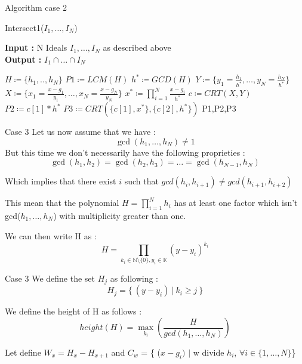 \documentclass{beamer}
\begin{document}
\begin{frame}{Algorithm case 2}
    \begin{algorithm}[H]
    \caption{Intersect1($I_{1},\dots,I_{N}$)}\label{alg:intersect-n-ideals-equal-gcd}
    \textbf{Input : } N Ideals $I_{1},\dots,I_{N}$ as described above \\
    \textbf{Output : }$I_{1} \cap \dots\cap I_ {N}$
\begin{algorithmic}
    \State $H \coloneqq \{h_{1},..,h_{N}\}$
    \State $P1 \coloneqq LCM(H)$
    \State $h^{*} \coloneqq GCD(H)$
    \State $Y\coloneqq \{y_{1}= \frac{h_{1}}{h^{*}},\dots,y_{N}= \frac{h_{N}}{h^{*}}\}$
    \State $X \coloneqq \{x_{1} = \frac{x-g_{1}}{y_{1}},\dots,x_{N} =\frac{x-g_{N}}{y_{N}}\}$
    \State $x^{*} \coloneqq \prod^{N}_{i=1} \frac{x-g_{i}}{h^{*}}$
    \State $c\coloneqq CRT(X,Y)$
    \State $P2 \coloneqq c[1]*h^{*}$ 
    \State $P3 \coloneqq CRT(\{c[1],x^{*}\},\{c[2], h^{*}\})$
    \State \Return P1,P2,P3
\end{algorithmic}
\end{algorithm}
\end{frame}

\begin{frame}{Case 3}
Let us now assume that we have :
\[\gcd(h_{1},\dots,h_{N}) \neq 1\]
But this time we don't necessarily have the following proprieties :
\[\gcd(h_{1},h_{2}) = \gcd(h_{2},h_{3}) = \dots = \gcd(h_{N-1},h_{N}) \]

Which implies that there exist $i$ such that $gcd(h_{i},h_{i+1}) \neq gcd(h_{i+1},h_{i+2})$

This mean that the polynomial $H = \prod_{i=1}^{N} h_{i}$ has at least one factor which isn't gcd($h_{1},\dots,h_{N}$) with multiplicity greater than one.

We can then write H as :
\[H=\prod_{k_{i} \in \mathbb{N}
 \setminus \{0\}, y_{i}\in \mathbb{K}} (y-y_{i})^{k_{i}}\]

\end{frame}

\begin{frame}{Case 3}
    We define the set $H_{j}$ as following :
\[H_{j} = \{\ (y-y_{i}) \ |\  k_{i} \geq j\ \}\]

We define the height of H as follows : \[height(H) = \max_{k_{i}}(\frac{H}{gcd(h_{1},\dots,h_{N})})\]

Let define $W_{x} = H_{x}-H_{x+1}$ and $C_{w}$ = \{ ($x-g_{i})$ $|$ w divide $h_{i}$, $\forall i \in \{1,\dots,N\}$\}\newline
\end{frame}
\end{document}
